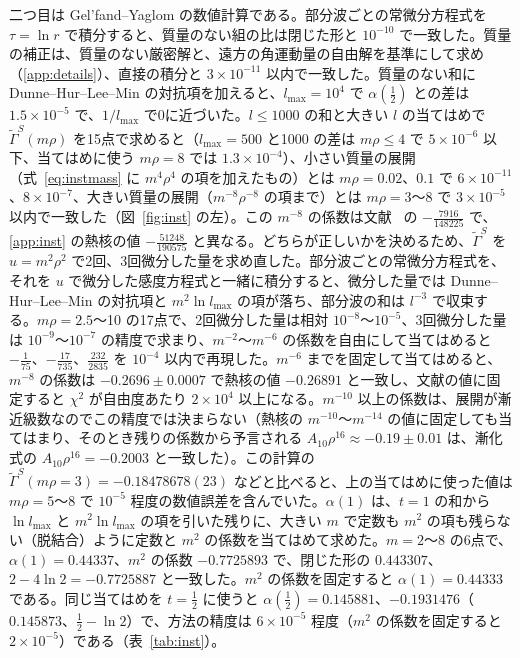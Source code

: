 \documentclass[a4paper,10pt]{ltjsarticle}
\begin{document}
二つ目は Gel'fand--Yaglom の数値計算である。部分波ごとの常微分方程式を $\tau=\ln r$ で積分すると、質量のない組の比は閉じた形と $10^{-10}$ で一致した。質量の補正は、質量のない厳密解と、遠方の角運動量の自由解を基準にして求め（\ref{app:details}）、直接の積分と $3\times10^{-11}$ 以内で一致した。質量のない和に Dunne--Hur--Lee--Min の対抗項を加えると、$l_{\max}=10^4$ で $\alpha(\frac12)$ との差は $1.5\times10^{-5}$ で、$1/l_{\max}$ で0に近づいた。$l\le1000$ の和と大きい $l$ の当てはめで $\tilde\Gamma^S(m\rho)$ を15点で求めると（$l_{\max}=500$ と1000 の差は $m\rho\le4$ で $5\times10^{-6}$ 以下、当てはめに使う $m\rho=8$ では $1.3\times10^{-4}$）、小さい質量の展開（式~\eqref{eq:instmass} に $m^4\rho^4$ の項を加えたもの）とは $m\rho=0.02$、$0.1$ で $6\times10^{-11}$、$8\times10^{-7}$、大きい質量の展開（$m^{-8}\rho^{-8}$ の項まで）とは $m\rho=3$〜$8$ で $3\times10^{-5}$ 以内で一致した（図~\ref{fig:inst} の左）。この $m^{-8}$ の係数は文献~\cite{dhlm05b} の $-\frac{7916}{148225}$ で、\ref{app:inst} の熱核の値 $-\frac{51248}{190575}$ と異なる。どちらが正しいかを決めるため、$\tilde\Gamma^S$ を $u=m^2\rho^2$ で2回、3回微分した量を求め直した。部分波ごとの常微分方程式を、それを $u$ で微分した感度方程式と一緒に積分すると、微分した量では Dunne--Hur--Lee--Min の対抗項と $m^2\ln l_{\max}$ の項が落ち、部分波の和は $l^{-3}$ で収束する。$m\rho=2.5$〜10 の17点で、2回微分した量は相対 $10^{-8}$〜$10^{-5}$、3回微分した量は $10^{-9}$〜$10^{-7}$ の精度で求まり、$m^{-2}$〜$m^{-6}$ の係数を自由にして当てはめると $-\frac1{75}$、$-\frac{17}{735}$、$\frac{232}{2835}$ を $10^{-4}$ 以内で再現した。$m^{-6}$ までを固定して当てはめると、$m^{-8}$ の係数は $-0.2696\pm0.0007$ で熱核の値 $-0.26891$ と一致し、文献の値に固定すると $\chi^2$ が自由度あたり $2\times10^4$ 以上になる。$m^{-10}$ 以上の係数は、展開が漸近級数なのでこの精度では決まらない（熱核の $m^{-10}$〜$m^{-14}$ の値に固定しても当てはまり、そのとき残りの係数から予言される $A_{10}\rho^{16}\approx-0.19\pm0.01$ は、漸化式の $A_{10}\rho^{16}=-0.2003$ と一致した）。この計算の $\tilde\Gamma^S(m\rho=3)=-0.18478678(23)$ などと比べると、上の当てはめに使った値は $m\rho=5$〜8 で $10^{-5}$ 程度の数値誤差を含んでいた。$\alpha(1)$ は、$t=1$ の和から $\ln l_{\max}$ と $m^2\ln l_{\max}$ の項を引いた残りに、大きい $m$ で定数も $m^2$ の項も残らない（脱結合）ように定数と $m^2$ の係数を当てはめて求めた。$m=2$〜8 の6点で、$\alpha(1)=0.44337$、$m^2$ の係数 $-0.7725893$ で、閉じた形の $0.443307$、$2-4\ln2=-0.7725887$ と一致した。$m^2$ の係数を固定すると $\alpha(1)=0.44333$ である。同じ当てはめを $t=\frac12$ に使うと $\alpha(\frac12)=0.145881$、$-0.1931476$（$0.145873$、$\frac12-\ln2$）で、方法の精度は $6\times10^{-5}$ 程度（$m^2$ の係数を固定すると $2\times10^{-5}$）である（表~\ref{tab:inst}）。
\end{document}
